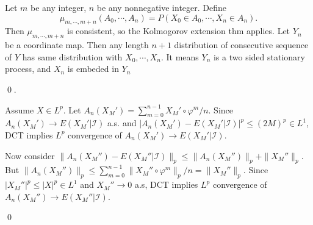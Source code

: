 \begin{problem}[6.1.4] \hfill
	
	Let $m$ be any integer, $n$ be any nonnegative integer.
	Define
	\[
		\mu_{m, \cdots, m+n}\left( A_0, \cdots, A_n \right)
		= P(X_0 \in A_0, \cdots, X_n \in A_n).
	\]
	Then $\mu_{m, \cdots, m+n}$ is consistent, so the Kolmogorov extension thm applies.
	Let $Y_n$ be a coordinate map.
	Then any length $n+1$ distribution of consecutive sequence of $Y$ has same distribution with $X_0, \cdots, X_n$.
	It means $Y_n$ is a two sided stationary process, and $X_n$ is embeded in $Y_n$

	\qed.
\end{problem}

\begin{problem}[6.2.1] \hfill

	Assume $X \in L^p$.
	Let $A_n(X_M') = \sum_{m=0}^{n-1}X_M' \circ \varphi^m /n$.
	Since $A_n(X_M') \rightarrow E(X_M' \lvert \mathcal{I})$ a.s. and
	$|A_n(X_M') - E(X_M'\lvert \mathcal{I}) |^p \le (2M)^p \in L^1$,
	DCT implies $L^p$ convergence of $A_n(X_M') \rightarrow E(X_M'\lvert \mathcal{I})$.

	Now consider $\| A_n(X_M'') - E(X_M'' \lvert \mathcal{I}) \|_p \le \| A_n(X_M'')\|_p + \|X_M''\|_p$. \\
	But $\| A_n(X_M'')\|_p \le \sum_{m=0}^{n-1} \| X_M'' \circ \varphi^m \|_p /n = \|X_M''\|_p$.
	Since $|X_M''|^p \le |X|^p \in L^1$ and $X_M'' \rightarrow 0$ a.s,
	DCT implies $L^p$ convergence of $A_n(X_M'') \rightarrow E(X_M'' \lvert \mathcal{I})$.

	\qed
\end{problem}

